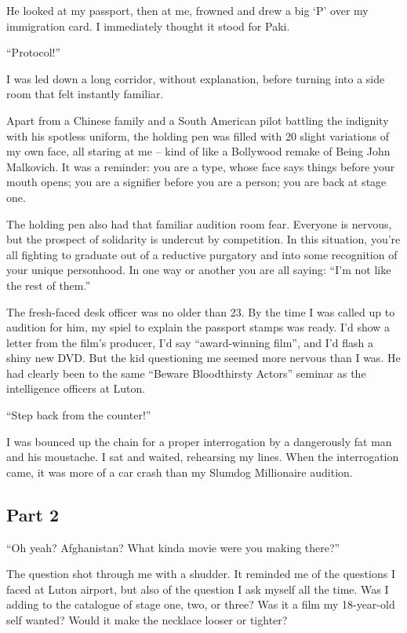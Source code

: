 \documentclass[10pt,a4paper]{article}
\begin{document}
He looked at my passport, then at me, frowned and drew a big ‘P’ over my immigration card. I immediately thought it stood for Paki.

“Protocol!”

I was led down a long corridor, without explanation, before turning into a side room that felt instantly familiar.

Apart from a Chinese family and a South American pilot battling the indignity with his spotless uniform, the holding pen was filled with 20 slight variations of my own face, all staring at me – kind of like a Bollywood remake of Being John Malkovich. It was a reminder: you are a type, whose face says things before your mouth opens; you are a signifier before you are a person; you are back at stage one.

The holding pen also had that familiar audition room fear. Everyone is nervous, but the prospect of solidarity is undercut by competition. In this situation, you’re all fighting to graduate out of a reductive purgatory and into some recognition of your unique personhood. In one way or another you are all saying: “I’m not like the rest of them.”

The fresh-faced desk officer was no older than 23. By the time I was called up to audition for him, my spiel to explain the passport stamps was ready. I’d show a letter from the film’s producer, I’d say “award-winning film”, and I’d flash a shiny new DVD. But the kid questioning me seemed more nervous than I was. He had clearly been to the same “Beware Bloodthirsty Actors” seminar as the intelligence officers at Luton.

“Step back from the counter!”

I was bounced up the chain for a proper interrogation by a dangerously fat man and his moustache. I sat and waited, rehearsing my lines. When the interrogation came, it was more of a car crash than my Slumdog Millionaire audition.

\subsection{Part 2}
“Oh yeah? Afghanistan? What kinda movie were you making there?”

The question shot through me with a shudder. It reminded me of the questions I faced at Luton airport, but also of the question I ask myself all the time. Was I adding to the catalogue of stage one, two, or three? Was it a film my 18-year-old self wanted? Would it make the necklace looser or tighter?
\end{document}

